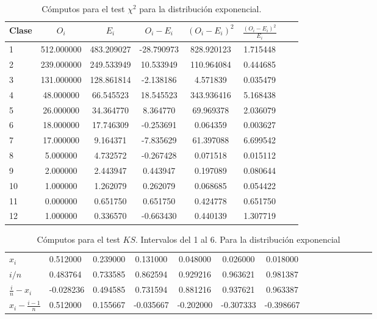 \documentclass[a4paper,10pt]{article}
\begin{document}
\begin{table}[ht]
\begin{center}
\begin{tabular}{l*{6}{c}r}
\hline
Clase& $O_i$ & $E_i$  & $O_i - E_i$ & $(O_i - E_i)^2$ & $\frac{(O_i - E_i)^2}{E_i}$\\
\hline
1&512.000000&483.209027&-28.790973&828.920123&1.715448\\
2&239.000000&249.533949&10.533949&110.964084&0.444685\\
3&131.000000&128.861814&-2.138186&4.571839&0.035479\\
4&48.000000&66.545523&18.545523&343.936416&5.168438\\
5&26.000000&34.364770&8.364770&69.969378&2.036079\\
6&18.000000&17.746309&-0.253691&0.064359&0.003627\\
7&17.000000&9.164371&-7.835629&61.397088&6.699542\\
8&5.000000&4.732572&-0.267428&0.071518&0.015112\\
9&2.000000&2.443947&0.443947&0.197089&0.080644\\
10&1.000000&1.262079&0.262079&0.068685&0.054422\\
11&0.000000&0.651750&0.651750&0.424778&0.651750\\
12&1.000000&0.336570&-0.663430&0.440139&1.307719\\
\hline
\end{tabular}
\caption{\label{tab:chi_table} Cómputos para el test $\chi^2$ para la distribución exponencial.}
\end{center}
\end{table}

\begin{table}[ht]
\begin{center}
\begin{tabular}{l|l*{12}{c}r}
\hline
$x_i$&0.512000&0.239000&0.131000&0.048000&0.026000&0.018000\\
$i/n$&0.483764&0.733585&0.862594&0.929216&0.963621&0.981387\\
$\frac{i}{n} - x_i$&-0.028236&0.494585&0.731594&0.881216&0.937621&0.963387\\
$x_i - \frac{i-1}{n}$&0.512000&0.155667&-0.035667&-0.202000&-0.307333&-0.398667\\
\hline
\end{tabular}
\caption{\label{tab:ks_table_first} Cómputos para el test $KS$. Intervalos del 1 al 6. Para la distribución exponencial}
\end{center}
\end{table}
\end{document}

